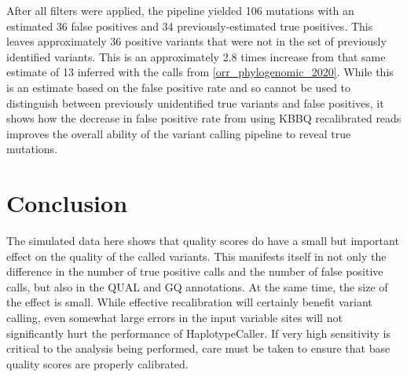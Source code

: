 After all filters were applied, the pipeline yielded 106 mutations with an estimated 36 false positives and 34 previously-estimated true positives. This leaves approximately 36 positive variants that were not in the set of previously identified variants. This is an approximately 2.8 times increase from that same estimate of 13 inferred with the calls from \ref{orr_phylogenomic_2020}. While this is an estimate based on the false positive rate and so cannot be used to distinguish between previously unidentified true variants and false positives, it shows how the decrease in false positive rate from using KBBQ recalibrated reads improves the overall ability of the variant calling pipeline to reveal true mutations.



\section{Conclusion}

The simulated data here shows that quality scores do have a small but important effect on the quality of the called variants. This manifests itself in not only the difference in the number of true positive calls and the number of false positive calls, but also in the QUAL and GQ annotations. At the same time, the size of the effect is small. While effective recalibration will certainly benefit variant calling, even somewhat large errors in the input variable sites will not significantly hurt the performance of HaplotypeCaller. If very high sensitivity is critical to the analysis being performed, care must be taken to ensure that base quality scores are properly calibrated.

\printbibliography
